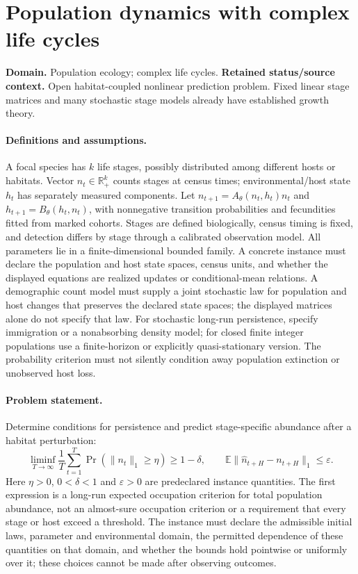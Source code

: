 \documentclass[11pt]{article}
\begin{document}
\section*{Population dynamics with complex life cycles}
\label{prob:185}
\label{rank:240}
\par\smallskip

\noindent\textbf{Domain.} Population ecology; complex life cycles. \quad \textbf{Retained status/source context.} Open habitat-coupled nonlinear prediction problem. Fixed linear stage matrices and many stochastic stage models already have established growth theory.
\paragraph{Definitions and assumptions.} A focal species has $k$ life stages, possibly distributed among different hosts or habitats. Vector $n_t\in\mathbb{R}_+^k$ counts stages at census times; environmental/host state $h_t$ has separately measured components. Let $n_{t+1}=A_\theta(n_t,h_t)n_t$ and $h_{t+1}=B_\theta(h_t,n_t)$, with nonnegative transition probabilities and fecundities fitted from marked cohorts. Stages are defined biologically, census timing is fixed, and detection differs by stage through a calibrated observation model. All parameters lie in a finite-dimensional bounded family. A concrete instance must declare the population and host state spaces, census units, and whether the displayed equations are realized updates or conditional-mean relations. A demographic count model must supply a joint stochastic law for population and host changes that preserves the declared state spaces; the displayed matrices alone do not specify that law. For stochastic long-run persistence, specify immigration or a nonabsorbing density model; for closed finite integer populations use a finite-horizon or explicitly quasi-stationary version. The probability criterion must not silently condition away population extinction or unobserved host loss.
\paragraph{Problem statement.} Determine conditions for persistence and predict stage-specific abundance after a habitat perturbation:
\[
 \liminf_{T\to\infty}\frac1T\sum_{t=1}^T
 \Pr(\|n_t\|_1\ge\eta)\ge1-\delta,
 \qquad
 \mathbb{E}\|\widehat n_{t+H}-n_{t+H}\|_1\le\varepsilon.
\]
Here $\eta>0$, $0<\delta<1$ and $\varepsilon>0$ are predeclared instance quantities. The first expression is a long-run expected occupation criterion for total population abundance, not an almost-sure occupation criterion or a requirement that every stage or host exceed a threshold. The instance must declare the admissible initial laws, parameter and environmental domain, the permitted dependence of these quantities on that domain, and whether the bounds hold pointwise or uniformly over it; these choices cannot be made after observing outcomes.
\end{document}
